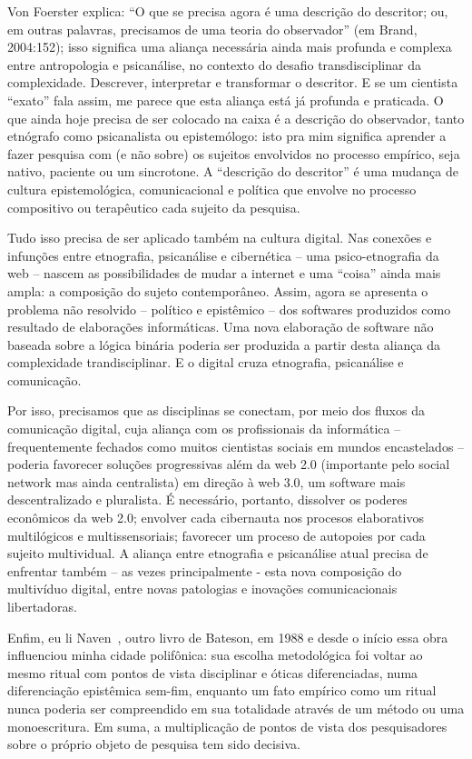 \documentclass[a4paper, 12pt]{article} %
\begin{document}
Von Foerster explica: “O que se precisa agora é uma descrição do descritor; ou, em outras palavras, precisamos de uma teoria do observador” (em Brand, 2004:152); isso significa uma aliança necessária ainda mais profunda e complexa entre antropologia e psicanálise, no contexto do desafio  transdisciplinar da complexidade. Descrever, interpretar e transformar o descritor. E se um cientista “exato” fala assim, me parece que esta aliança está já profunda e praticada. O que ainda hoje precisa de ser colocado na caixa é a descrição do observador, tanto etnógrafo como psicanalista ou epistemólogo: isto pra mim significa aprender a fazer pesquisa com (e não sobre) os sujeitos envolvidos no processo empírico, seja nativo, paciente ou um sincrotone. A “descrição do descritor” é uma mudança de cultura epistemológica, comunicacional e política que envolve no processo compositivo ou terapêutico cada sujeito da pesquisa. 

Tudo isso precisa de ser aplicado também na cultura digital.  Nas conexões  e infunções entre etnografia, psicanálise e cibernética – uma psico-etnografia da web – nascem as possibilidades de mudar a internet e uma “coisa” ainda mais ampla: a composição do sujeto contemporâneo. Assim, agora se apresenta o problema não resolvido – político e epistêmico – dos softwares produzidos como resultado de elaborações informáticas. Uma nova elaboração de software não baseada sobre a lógica binária poderia ser produzida a partir desta aliança da complexidade trandisciplinar. E o digital cruza etnografia, psicanálise e comunicação.

Por isso, precisamos que as disciplinas se conectam, por meio dos fluxos da comunicação digital, cuja aliança com os profissionais da informática – frequentemente fechados como muitos cientistas sociais em mundos encastelados – poderia favorecer soluções progressivas além da web 2.0 (importante pelo social network mas ainda centralista) em direção à web 3.0, um software  mais descentralizado e pluralista. É necessário, portanto, dissolver os poderes econômicos da web 2.0; envolver cada cibernauta nos procesos elaborativos multilógicos e multissensoriais; favorecer um proceso de autopoies por cada sujeito multividual. A aliança entre etnografia e psicanálise atual precisa de enfrentar também – as vezes principalmente  - esta nova composição do multivíduo digital, entre novas patologias e inovações comunicacionais libertadoras.

Enfim, eu li Naven~\cite{b7}, outro livro de Bateson, em 1988 e desde o início essa obra influenciou minha cidade polifônica: sua escolha metodológica foi voltar ao mesmo ritual com pontos de vista disciplinar e óticas diferenciadas, numa diferenciação epistêmica sem-fim, enquanto um fato empírico como um ritual nunca poderia ser compreendido em sua totalidade através de um método ou uma monoescritura. Em suma, a multiplicação de pontos de vista dos pesquisadores sobre o próprio objeto de pesquisa tem sido decisiva. 
\end{document}
